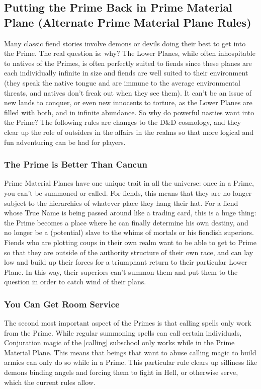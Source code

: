 \subsection{Putting the Prime Back in Prime Material Plane (Alternate Prime Material Plane Rules)}
Many classic fiend stories involve demons or devils doing their best to get into the Prime. The real question is: why? The Lower Planes, while often inhospitable to natives of the Primes, is often perfectly suited to fiends since these planes are each individually infinite in size and fiends are well suited to their environment (they speak the native tongue and are immune to the average environmental threats, and natives don't freak out when they see them). It can't be an issue of new lands to conquer, or even new innocents to torture, as the Lower Planes are filled with both, and in infinite abundance. So why do powerful nasties want into the Prime? The following rules are changes to the D\&D cosmology, and they clear up the role of outsiders in the affairs in the realms so that more logical and fun adventuring can be had for players.

\subsubsection{The Prime is Better Than Cancun}
Prime Material Planes have one unique trait in all the universe: once in a Prime, you can't be summoned or called. For fiends, this means that they are no longer subject to the hierarchies of whatever place they hang their hat. For a fiend whose True Name is being passed around like a trading card, this is a huge thing: the Prime becomes a place where he can finally determine his own destiny, and no longer be a (potential) slave to the whims of mortals or his fiendish superiors. Fiends who are plotting coups in their own realm want to be able to get to Prime so that they are outside of the authority structure of their own race, and can lay low and build up their forces for a triumphant return to their particular Lower Plane. In this way, their superiors can't summon them and put them to the question in order to catch wind of their plans.

\subsubsection{You Can Get Room Service}
The second most important aspect of the Primes is that calling spells only work from the Prime. While regular summoning spells can call certain individuals, Conjuration magic of the [calling] subschool only works while in the Prime Material Plane. This means that beings that want to abuse calling magic to build armies can only do so while in a Prime. This particular rule clears up silliness like demons binding angels and forcing them to fight in Hell, or otherwise serve, which the current rules allow.

